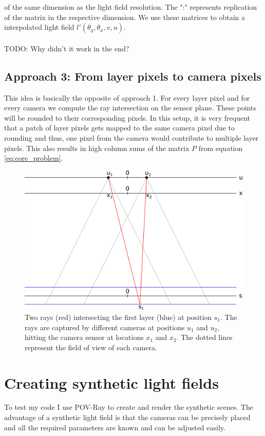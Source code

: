 \documentclass[11pt,a4paper,titlepage]{article}
\begin{document}
of the same dimension as the light field resolution. The ":" represents replication of the matrix in the respective dimension. We use these matrices to obtain a interpolated light field $l' \left( \theta_y, \theta_x, v, u \right)$.
\\\\ TODO: Why didn't it work in the end? 

\subsection{Approach 3: From layer pixels to camera pixels}
This idea is basically the opposite of approach 1. For every layer pixel and for every camera we compute the ray intersection on the sensor plane. These points will be rounded to their corresponding pixels. In this setup, it is very frequent that a patch of layer pixels gets mapped to the same camera pixel due to rounding and thus, one pixel from the camera would contribute to multiple layer pixels. This also results in high column sums of the matrix $P$ from equation \ref{eq:core_problem}.

\begin{figure}[h]
	\centering
	\includegraphics[scale=0.5]{sketches/camera_layers_sketch.png} 
	\caption{Two rays (red) intersecting the first layer (blue) at position $s_1$. The rays are captured by different cameras at positions $u_1$ and $u_2$, hitting the camera sensor at locations $x_1$ and $x_2$. The dotted lines represent the field of view of each camera.}
	\label{fig:cameras_layers_sketch}
\end{figure}

\section{Creating synthetic light fields}
To test my code I use POV-Ray to create and render the synthetic scenes. The advantage of a synthetic light field is that the cameras can be precisely placed and all the required parameters are known and can be adjusted easily. 

\newpage


\end{document}
